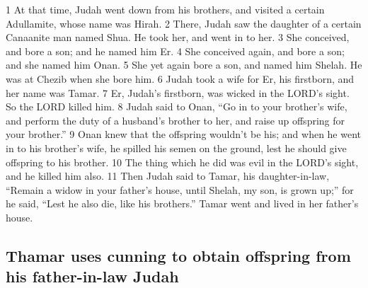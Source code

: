 {1} At that time, Judah went down from his brothers, and visited a
certain Adullamite, whose name was Hirah. {2} There, Judah saw the
daughter of a certain Canaanite man named Shua. He took her, and went in
to her. {3} She conceived, and bore a son; and he named him Er. {4} She
conceived again, and bore a son; and she named him Onan. {5} She yet
again bore a son, and named him Shelah. He was at Chezib when she bore
him. {6} Judah took a wife for Er, his firstborn, and her name was
Tamar. {7} Er, Judah's firstborn, was wicked in the LORD's sight. So the
LORD killed him. {8} Judah said to Onan, ``Go in to your brother's wife,
and perform the duty of a husband's brother to her, and raise up
offspring for your brother.'' {9} Onan knew that the offspring wouldn't
be his; and when he went in to his brother's wife, he spilled his semen
on the ground, lest he should give offspring to his brother. {10} The
thing which he did was evil in the LORD's sight, and he killed him also.
{11} Then Judah said to Tamar, his daughter-in-law, ``Remain a widow in
your father's house, until Shelah, my son, is grown up;'' for he said,
``Lest he also die, like his brothers.'' Tamar went and lived in her
father's house.

\hypertarget{thamar-uses-cunning-to-obtain-offspring-from-his-father-in-law-judah}{%
\subsection{Thamar uses cunning to obtain offspring from his
father-in-law
Judah}\label{thamar-uses-cunning-to-obtain-offspring-from-his-father-in-law-judah}}

